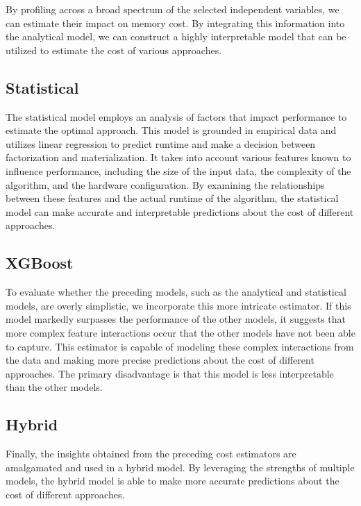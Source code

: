 

By profiling across a broad spectrum of the selected independent variables, we can estimate their impact on memory cost. By integrating this information into the analytical model, we can construct a highly interpretable model that can be utilized to estimate the cost of various approaches.

\subsection{Statistical}
The statistical model employs an analysis of factors that impact performance to estimate the optimal approach. This model is grounded in empirical data and utilizes linear regression to predict runtime and make a decision between factorization and materialization. It takes into account various features known to influence performance, including the size of the input data, the complexity of the algorithm, and the hardware configuration. By examining the relationships between these features and the actual runtime of the algorithm, the statistical model can make accurate and interpretable predictions about the cost of different approaches.

\subsection{XGBoost}
To evaluate whether the preceding models, such as the analytical and statistical models, are overly simplistic, we incorporate this more intricate estimator. If this model markedly surpasses the performance of the other models, it suggests that more complex feature interactions occur that the other models have not been able to capture. This estimator is capable of modeling these complex interactions from the data and making more precise predictions about the cost of different approaches. The primary disadvantage is that this model is less interpretable than the other models.

\subsection{Hybrid}
Finally, the insights obtained from the preceding cost estimators are amalgamated and used in a hybrid model. By leveraging the strengths of multiple models, the hybrid model is able to make more accurate predictions about the cost of different approaches.